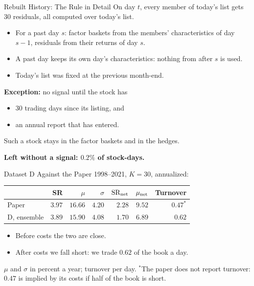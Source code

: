 \documentclass[11pt]{beamer}
\newcommand{\src}[1]{%
  \par\vfill
  {\fontsize{6.4}{7.6}\selectfont\color{Muted}#1\par}
}
\newcommand{\claim}[1]{%
  \par{\color{SBred}\bfseries #1\par}
}
\renewcommand{\src}[1]{%
  \par\vfill
  {\fontsize{6.4}{7.6}\selectfont#1\par}
}
\begin{document}
\begin{frame}{Rebuilt History: The Rule in Detail}
On day $t$, every member of today's list gets 30 residuals, all computed over today's list.
\begin{itemize}
\item For a past day $s$: factor baskets from the members' characteristics of day $s-1$,
      residuals from their returns of day $s$.
\item A past day keeps its own day's characteristics: nothing from after $s$ is used.
\item Today's list was fixed at the previous month-end.
\end{itemize}
\textbf{Exception:} no signal until the stock has
\begin{itemize}
\item 30 trading days since its listing, and
\item an annual report that has entered.
\end{itemize}
Such a stock stays in the factor baskets and in the hedges.

\claim{Left without a signal: $0.2\%$ of stock-days.}
\end{frame}

\begin{frame}{Dataset D Against the Paper}
1998--2021, $K=30$, annualized:
\begin{center}
\begin{tabular}{@{}lrrrrrr@{}}
\toprule
 & SR & $\mu$ & $\sigma$ & $\mathrm{SR}_{\rm net}$ & $\mu_{\rm net}$ & Turnover\\
\midrule
Paper & $3.97$ & $16.66$ & $4.20$ & $2.28$ & $9.52$ & $0.47^{*}$\\
D, ensemble & $3.89$ & $15.90$ & $4.08$ & $1.70$ & $6.89$ & $0.62$\\
\bottomrule
\end{tabular}
\end{center}
\begin{itemize}
\item Before costs the two are close.
\item After costs we fall short: we trade $0.62$ of the book a day.
\end{itemize}
\src{$\mu$ and $\sigma$ in percent a year; turnover per day. $^{*}$The paper does not report turnover: $0.47$ is implied by its costs if half of the book is short.}
\end{frame}
\end{document}
